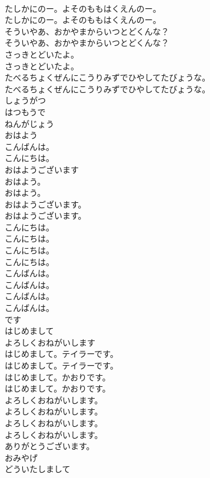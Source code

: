\documentclass[8pt]{extreport}
\begin{document}
\begin{CJK}{UTF8}{min}
\\	たしかにのー。よそのももはくえんのー。	
\\	たしかにのー。よそのももはくえんのー。 
\\	そういやあ、おかやまからいつとどくんな？	
\\	そういやあ、おかやまからいつとどくんな？ 
\\	さっきとどいたよ。	
\\	さっきとどいたよ。 
\\	たべるちょくぜんにこうりみずでひやしてたびょうな。	
\\	たべるちょくぜんにこうりみずでひやしてたびょうな。 
\\	しょうがつ
\\	はつもうで
\\	ねんがじょう
\\	おはよう
\\	こんばんは。
\\	こんにちは。
\\	おはようございます
\\	おはよう。	
\\	おはよう。 
\\	おはようございます。	
\\	おはようございます。 
\\	こんにちは。	
\\	こんにちは。 
\\	こんにちは。	
\\	こんにちは。 
\\	こんばんは。	
\\	こんばんは。 
\\	こんばんは。	
\\	こんばんは。 
\\	です
\\	はじめまして
\\	よろしくおねがいします
\\	はじめまして。テイラーです。	
\\	はじめまして。テイラーです。 
\\	はじめまして。かおりです。	
\\	はじめまして。かおりです。 
\\	よろしくおねがいします。	
\\	よろしくおねがいします。 
\\	よろしくおねがいします。	
\\	よろしくおねがいします。 
\\	ありがとうございます。
\\	おみやげ
\\	どういたしまして

\end{CJK}
\end{document}
